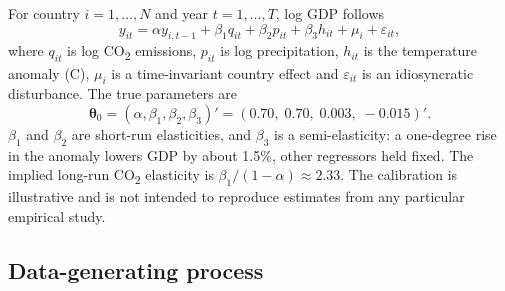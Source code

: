 \documentclass[11pt,a4paper]{article}
\newcommand{\COtwo}{CO\textsubscript{2}}
\begin{document}
For country $i=1,\dots,N$ and year $t=1,\dots,T$, log GDP follows
\begin{equation}\label{eq:model}
y_{it}=\alpha y_{i,t-1}+\beta_1 q_{it}+\beta_2 p_{it}+\beta_3 h_{it}+\mu_i+\varepsilon_{it},
\end{equation}
where $q_{it}$ is log \COtwo{} emissions, $p_{it}$ is log precipitation, $h_{it}$ is the temperature anomaly (\textdegree C), $\mu_i$ is a time-invariant country effect and $\varepsilon_{it}$ is an idiosyncratic disturbance. The true parameters are
\begin{equation}\label{eq:theta}
\bm\theta_0=(\alpha,\beta_1,\beta_2,\beta_3)'=(0.70,\;0.70,\;0.003,\;-0.015)'.
\end{equation}
$\beta_1$ and $\beta_2$ are short-run elasticities, and $\beta_3$ is a semi-elasticity: a one-degree rise in the anomaly lowers GDP by about 1.5\%, other regressors held fixed. The implied long-run \COtwo{} elasticity is $\beta_1/(1-\alpha)\approx2.33$. The calibration is illustrative and is not intended to reproduce estimates from any particular empirical study.

\subsection{Data-generating process}\label{sec:dgp}
\end{document}
